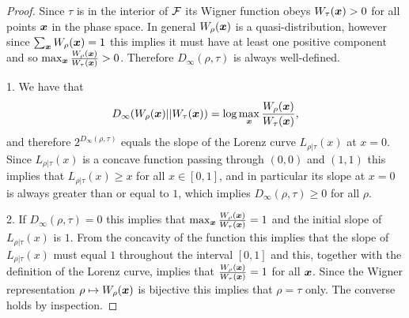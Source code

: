 \documentclass[pra,
aps,
twocolumn,
superscriptaddress,
groupedaddress,
nofootinbib,
reprint
]{revtex4-1}
\begin{document}
\begin{proof}Since $\tau$ is in the interior of ${\mathcal F}$ its Wigner function obeys $W_\tau(\boldsymbol{x}) >0$ for all points $\boldsymbol{x}$ in the phase space. In general $W_\rho(\boldsymbol{x})$ is a quasi-distribution, however since $\sum_{\boldsymbol{x}} W_\rho (\boldsymbol{x}) = 1$ this implies it must have at least one positive component and so $\max_{\boldsymbol{x}} \frac{W_\rho(\boldsymbol{x})}{W_\tau(\boldsymbol{x})}>0$. Therefore $D_\infty (\rho,\tau)$ is always well-defined. 

1. We have that 
\begin{equation}
D_\infty(W_\rho(\boldsymbol{x}) || W_\tau (\boldsymbol{x})) =\log  \max_{\boldsymbol{x}} \frac{W_\rho(\boldsymbol{x})}{W_\tau(\boldsymbol{x})},
\end{equation}
and therefore $2^{D_\infty(\rho,\tau)}$ equals the slope of the Lorenz curve $L_{\rho|\tau}(x)$ at $x=0$. Since $L_{\rho|\tau}(x)$ is a concave function passing through $(0,0)$ and $(1,1)$ this implies that $L_{\rho |\tau}(x) \ge x$ for all $x \in [0,1]$, and in particular its slope at $x=0$ is always greater than or equal to $1$, which implies $D_\infty (\rho,\tau) \ge 0$ for all $\rho$.

2. If $D_\infty (\rho,\tau) = 0$ this implies that $\max_{\boldsymbol{x}} \frac{W_\rho(\boldsymbol{x})}{W_\tau(\boldsymbol{x})}=1$ and the initial slope of $L_{\rho|\tau}(x)$ is $1$. From the concavity of the function this implies that the slope of $L_{\rho|\tau}(x)$ must equal $1$ throughout the interval $[0,1]$ and this, together with the definition of the Lorenz curve, implies that $\frac{W_\rho(\boldsymbol{x})}{W_\tau(\boldsymbol{x})}=1$ for all $\boldsymbol{x}$. Since the Wigner representation $\rho \mapsto W_\rho(\boldsymbol{x})$ is bijective this implies that $\rho = \tau$ only. The converse holds by inspection.


\end{proof}
\end{document}
